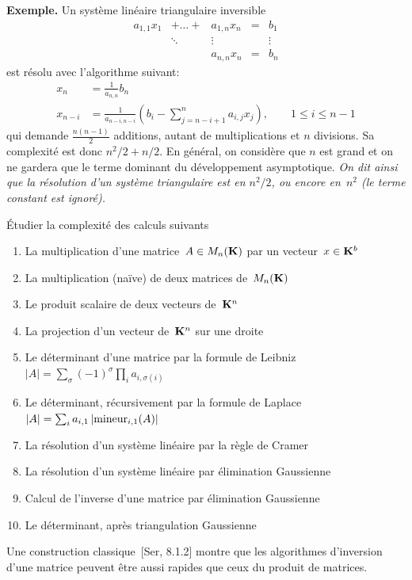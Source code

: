 {\bf Exemple.}
Un système linéaire triangulaire inversible
\[
\begin{array}{ccccc}
a_{1,1}x_1  & + \ldots +  & a_{1,n}x_n & = & b_1 \\
& \ddots & \vdots && \vdots \\
&& a_{n,n}x_n & =&  b_n
\end{array}
\]
est résolu avec l'algorithme suivant:
\begin{align*}
x_n & = \frac{1}{a_{n,n}}b_n \\
x_{n-i} & = \frac{1}{a_{n-i,n-i}}\left(
b_i - \sum_{j=n-i+1}^{n} a_{i,j}x_j
\right), \qquad 1 \leq i \leq n-1
\end{align*}
qui demande $\frac{n(n-1)}{2}$ additions, autant de multiplications et $n$
divisions. Sa complexité est donc ${n^2}/{2} + n/2$. En général, on considère
que $n$ est grand et on ne gardera que le terme dominant du développement
asymptotique.
\emph{On dit ainsi que la résolution d'un système triangulaire est en
$n^2/2$, ou encore en~$n^2$ (le terme constant est ignoré).}

\begin{exercice}Étudier la complexité des calculs suivants
	\begin{enumerate}
		\item La multiplication d'une matrice~$A\in M_n(\mathbf{K})$ par un
			vecteur~$x\in\mathbf{K}^b$
		\item La multiplication (naïve) de deux matrices de~$M_n(\mathbf{K})$
		\item Le produit scalaire de deux vecteurs de~$\mathbf{K}^n$
		\item La projection d'un vecteur de~$\mathbf{K}^n$ sur une droite
		\item Le déterminant d'une matrice par la formule de
			Leibniz~$|A|=\sum_\sigma(-1)^\sigma\prod_i a_{i,\sigma(i)}$
		\item Le déterminant, récursivement par la formule de
			Laplace~$\left|A\right|=\sum_ia_{i,1}\left|\mathrm{mineur}_{i,1}(A)\right|$
		\item La résolution d'un système linéaire par la règle de Cramer
		\item La résolution d'un système linéaire par élimination Gaussienne
		\item Calcul de l'inverse d'une matrice par élimination Gaussienne
		\item Le déterminant, après triangulation Gaussienne
	\end{enumerate}
\end{exercice}

Une construction classique~[Ser, 8.1.2] montre que les algorithmes
d'inversion d'une matrice peuvent être aussi rapides que ceux du produit de
matrices.

